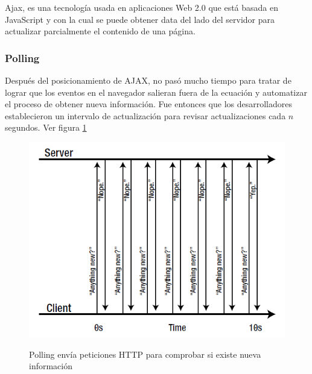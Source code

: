 Ajax, es una tecnología usada en aplicaciones Web 2.0 que está basada en JavaScript y con la cual se puede obtener data del lado del servidor para actualizar parcialmente el contenido de una página\cite{wang_design_2014}.

\subsubsection{Polling}
Después del posicionamiento de AJAX, no pasó mucho tiempo para tratar de lograr que los eventos en el navegador salieran fuera de la ecuación y automatizar el proceso de obtener nueva información. Fue entonces que los desarrolladores establecieron un intervalo de actualización para revisar actualizaciones cada $n$ segundos. Ver figura \ref{fig:polling}
\begin{figure}[h]
  \centering
  \includegraphics[scale=0.8]{figuras/polling.png}\\
  \caption{Polling envía peticiones HTTP para comprobar si existe nueva información}\label{fig:polling}
\end{figure}


